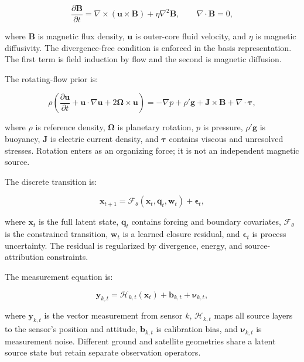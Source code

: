 \documentclass[conference]{IEEEtran}
\begin{document}
\begin{equation}
\frac{\partial \mathbf{B}}{\partial t}=\nabla\times(\mathbf{u}\times\mathbf{B})+\eta\nabla^2\mathbf{B},\qquad \nabla\cdot\mathbf{B}=0,
\label{eq:induction}
\end{equation}

where $\mathbf{B}$ is magnetic flux density, $\mathbf{u}$ is outer-core fluid velocity, and $\eta$ is magnetic diffusivity. The divergence-free condition is enforced in the basis representation. The first term is field induction by flow and the second is magnetic diffusion.

The rotating-flow prior is:

\begin{equation}
\rho\left(\frac{\partial \mathbf{u}}{\partial t}+\mathbf{u}\cdot\nabla\mathbf{u}+2\boldsymbol{\Omega}\times\mathbf{u}\right)=-\nabla p+\rho'\mathbf{g}+\mathbf{J}\times\mathbf{B}+\nabla\cdot\boldsymbol{\tau},
\label{eq:momentum}
\end{equation}

where $\rho$ is reference density, $\boldsymbol{\Omega}$ is planetary rotation, $p$ is pressure, $\rho'\mathbf{g}$ is buoyancy, $\mathbf{J}$ is electric current density, and $\boldsymbol{\tau}$ contains viscous and unresolved stresses. Rotation enters as an organizing force; it is not an independent magnetic source.

The discrete transition is:

\begin{equation}
\mathbf{x}_{t+1}=\mathcal{F}_{\theta}(\mathbf{x}_t,\mathbf{q}_t,\mathbf{w}_t)+\boldsymbol{\epsilon}_t,
\label{eq:transition}
\end{equation}

where $\mathbf{x}_t$ is the full latent state, $\mathbf{q}_t$ contains forcing and boundary covariates, $\mathcal{F}_{\theta}$ is the constrained transition, $\mathbf{w}_t$ is a learned closure residual, and $\boldsymbol{\epsilon}_t$ is process uncertainty. The residual is regularized by divergence, energy, and source-attribution constraints.

The measurement equation is:

\begin{equation}
\mathbf{y}_{k,t}=\mathcal{H}_{k,t}(\mathbf{x}_t)+\mathbf{b}_{k,t}+\boldsymbol{\nu}_{k,t},
\label{eq:observation}
\end{equation}

where $\mathbf{y}_{k,t}$ is the vector measurement from sensor $k$, $\mathcal{H}_{k,t}$ maps all source layers to the sensor's position and attitude, $\mathbf{b}_{k,t}$ is calibration bias, and $\boldsymbol{\nu}_{k,t}$ is measurement noise. Different ground and satellite geometries share a latent source state but retain separate observation operators.
\end{document}
